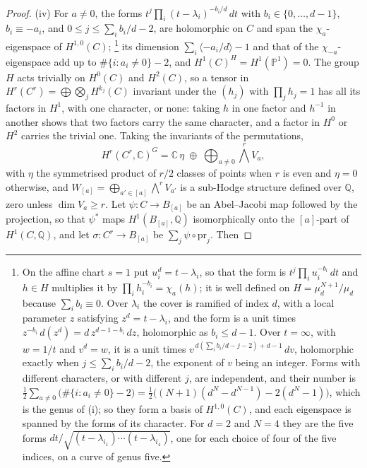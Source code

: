 \documentclass[11pt,reqno]{amsart}
\theoremstyle{plain}
\theoremstyle{definition}
\theoremstyle{remark}
\newcommand{\QQ}{\mathbb{Q}}
\newcommand{\CC}{\mathbb{C}}
\newcommand{\PP}{\mathbb{P}}
\begin{document}
\begin{proof}
(iv) For $a\ne0$, the forms
$t^{j}\prod_{i}(t-\lambda_{i})^{-b_{i}/d}\,dt$ with $b_{i}\in\{0,\dots,d-1\}$,
$b_{i}\equiv-a_{i}$, and $0\le j\le\sum_{i}b_{i}/d-2$, are holomorphic on $C$
and span the $\chi_{a}$-eigenspace of $H^{1,0}(C)$;%
\footnote{On the affine chart $s=1$ put $u_{i}^{d}=t-\lambda_{i}$, so that the
form is $t^{j}\prod_{i}u_{i}^{-b_{i}}\,dt$ and $h\in H$ multiplies it by
$\prod_{i}h_{i}^{-b_{i}}=\chi_{a}(h)$; it is well defined on
$H=\mu_{d}^{N+1}/\mu_{d}$ because $\sum_{i}b_{i}\equiv0$. Over $\lambda_{i}$
the cover is ramified of index $d$, with a local parameter $z$ satisfying
$z^{d}=t-\lambda_{i}$, and the form is a unit times
$z^{-b_{i}}\,d(z^{d})=d\,z^{d-1-b_{i}}\,dz$, holomorphic as $b_{i}\le d-1$.
Over $t=\infty$, with $w=1/t$ and $v^{d}=w$, it is a unit times
$v^{\,d(\sum_{i}b_{i}/d-j-2)+d-1}\,dv$, holomorphic exactly when
$j\le\sum_{i}b_{i}/d-2$, the exponent of $v$ being an integer. Forms with
different characters, or with different $j$, are independent, and their
number is
$\tfrac12\sum_{a\ne0}\bigl(\#\{i:a_{i}\ne0\}-2\bigr)
=\tfrac12\bigl((N+1)(d^{N}-d^{N-1})-2(d^{N}-1)\bigr)$, which is the genus of
(i); so they form a basis of $H^{1,0}(C)$, and each eigenspace is spanned by
the forms of its character. For $d=2$ and $N=4$ they are the five forms
$dt/\sqrt{(t-\lambda_{i_{1}})\cdots(t-\lambda_{i_{4}})}$, one for each choice
of four of the five indices, on a curve of genus five.}
its dimension
$\sum_{i}\langle-a_{i}/d\rangle-1$ and that of the $\chi_{-a}$-eigenspace add up
to $\#\{i:a_{i}\ne0\}-2$, and $H^{1}(C)^{H}=H^{1}(\PP^{1})=0$. The group $H$
acts trivially on $H^{0}(C)$ and $H^{2}(C)$, so a tensor in
$H^{r}(C^{r})=\bigoplus\bigotimes_{j}H^{k_{j}}(C)$ invariant under the
$(h_{j})$ with $\prod_{j}h_{j}=1$ has all its factors in $H^{1}$, with one
character, or none: taking $h$ in one factor and $h^{-1}$ in another shows
that two factors carry the same character, and a factor in $H^{0}$ or
$H^{2}$ carries the trivial one. Taking the invariants of the permutations,
\[
  H^{r}(C^{r},\CC)^{G}=\CC\,\eta\;\oplus\;\bigoplus_{a\ne0}\textstyle\bigwedge^{r}V_{a},
\]
with $\eta$ the symmetrised product of $r/2$ classes of points when $r$ is
even and $\eta=0$ otherwise, and $W_{[a]}=\bigoplus_{a'\in[a]}\bigwedge^{r}V_{a'}$
is a sub-Hodge structure defined over $\QQ$, zero unless $\dim V_{a}\ge r$.
Let $\psi\colon C\to B_{[a]}$ be an Abel--Jacobi map followed by the
projection, so that $\psi^{*}$ maps $H^{1}(B_{[a]},\QQ)$ isomorphically onto
the $[a]$-part of $H^{1}(C,\QQ)$, and let $\sigma\colon C^{r}\to B_{[a]}$ be
$\sum_{j}\psi\circ\mathrm{pr}_{j}$. Then

\end{proof}
\end{document}
